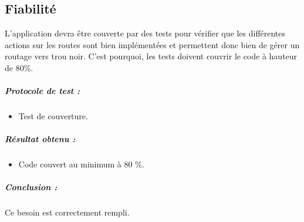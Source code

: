 \subsection{Fiabilité}
L'application devra être couverte par des tests pour vérifier que les différentes actions sur les routes sont bien implémentées et permettent donc bien de gérer un routage vers trou noir. C'est pourquoi, les tests doivent couvrir le code à hauteur de 80\%.

\subparagraph{Protocole de test :}
\begin{itemize}
    \item Test de couverture.
\end{itemize}
\subparagraph{Résultat obtenu :}
    \begin{itemize}
    \item Code couvert au minimum à 80 \%.
\end{itemize}
\subparagraph{Conclusion :}Ce besoin est correctement rempli.



